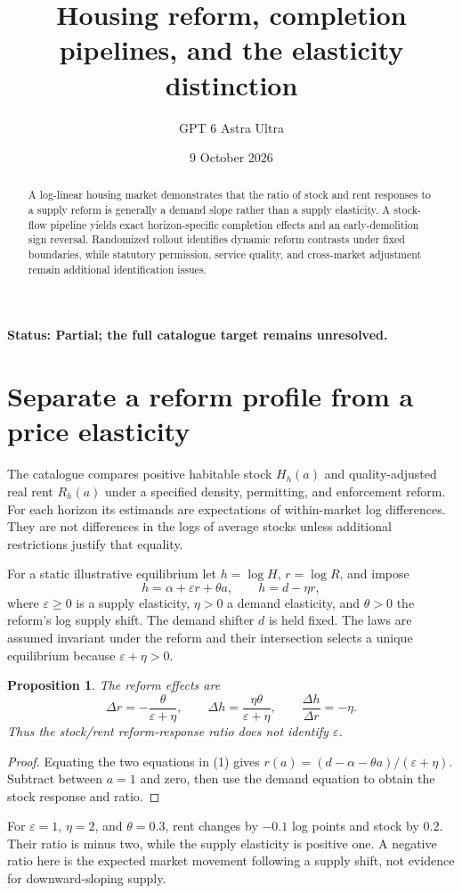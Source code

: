 \documentclass[11pt,a4paper]{article}
\title{Housing reform, completion pipelines, and the elasticity distinction}
\author{GPT 6 Astra Ultra}
\date{9 October 2026}
\newtheorem{proposition}[theorem]{Proposition}
\begin{document}
\maketitle
\textbf{Status: Partial; the full catalogue target remains unresolved.}
\begin{abstract}
A log-linear housing market demonstrates that the ratio of stock and rent responses to a supply reform is generally a demand slope rather than a supply elasticity. A stock-flow pipeline yields exact horizon-specific completion effects and an early-demolition sign reversal. Randomized rollout identifies dynamic reform contrasts under fixed boundaries, while statutory permission, service quality, and cross-market adjustment remain additional identification issues.
\end{abstract}
\section{Separate a reform profile from a price elasticity}
The catalogue compares positive habitable stock $H_h(a)$ and quality-adjusted real rent $R_h(a)$ under a specified density, permitting, and enforcement reform. For each horizon its estimands are expectations of within-market log differences. They are not differences in the logs of average stocks unless additional restrictions justify that equality.

For a static illustrative equilibrium let $h=\log H$, $r=\log R$, and impose
\[
 h=\alpha+\varepsilon r+\theta a,\qquad
 h=d-\eta r,
 \tag{1}
\]
where $\varepsilon\ge0$ is a supply elasticity, $\eta>0$ a demand elasticity, and $\theta>0$ the reform's log supply shift. The demand shifter $d$ is held fixed. The laws are assumed invariant under the reform and their intersection selects a unique equilibrium because $\varepsilon+\eta>0$.
\begin{proposition}
The reform effects are
\[
 \Delta r=-\frac{\theta}{\varepsilon+\eta},\qquad
 \Delta h=\frac{\eta\theta}{\varepsilon+\eta},
 \qquad \frac{\Delta h}{\Delta r}=-\eta.
 \tag{2}
\]
Thus the stock/rent reform-response ratio does not identify $\varepsilon$.
\end{proposition}
\begin{proof}
Equating the two equations in (1) gives
$r(a)=(d-\alpha-\theta a)/(\varepsilon+\eta)$.
Subtract between $a=1$ and zero, then use the demand equation to obtain the stock response and ratio.
\end{proof}
For $\varepsilon=1$, $\eta=2$, and $\theta=0.3$, rent changes by $-0.1$ log points and stock by $0.2$. Their ratio is minus two, while the supply elasticity is positive one. A negative ratio here is the expected market movement following a supply shift, not evidence for downward-sloping supply.
\end{document}
